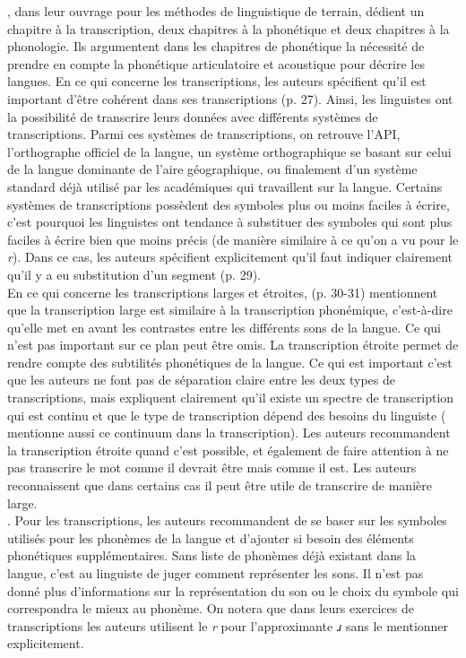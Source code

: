 \textcite{vauxIntroductionLinguisticField2003}, dans leur ouvrage pour les méthodes de linguistique de terrain, dédient un chapitre à la transcription, deux chapitres à la phonétique et deux chapitres à la phonologie. Ils argumentent dans les chapitres de phonétique la nécessité de prendre en compte la phonétique articulatoire et acoustique pour décrire les langues.
En ce qui concerne les transcriptions, les auteurs spécifient qu'il est important d'être cohérent dans ses transcriptions (p. 27). Ainsi, les linguistes ont la possibilité de transcrire leurs données avec différents systèmes de transcriptions. Parmi ces systèmes de transcriptions, on retrouve l'API, l'orthographe officiel de la langue, un système orthographique se basant sur celui de la langue dominante de l'aire géographique, ou finalement d'un système standard déjà utilisé par les académiques qui travaillent sur la langue.
Certains systèmes de transcriptions possèdent des symboles plus ou moins faciles à écrire, c'est pourquoi les linguistes ont tendance à substituer des symboles qui sont plus faciles à écrire bien que moins précis (de manière similaire à ce qu'on a vu pour le \textit{r}). Dans ce cas, les auteurs spécifient explicitement qu'il faut indiquer clairement qu'il y a eu substitution d'un segment (p. 29).\\

En ce qui concerne les transcriptions larges et étroites, \citeauthor{vauxIntroductionLinguisticField2003} (p. 30-31) mentionnent que la transcription large est similaire à la transcription phonémique, c'est-à-dire qu'elle met en avant les contrastes entre les différents sons de la langue. Ce qui n'est pas important sur ce plan peut être omis. La transcription étroite permet de rendre compte des subtilités phonétiques de la langue. Ce qui est important c'est que les auteurs ne font pas de séparation claire entre les deux types de transcriptions, mais expliquent clairement qu'il existe un spectre de transcription qui est continu et que le type de transcription dépend des besoins du linguiste (\textcite[73]{bowernLinguisticFieldwork2015} mentionne aussi ce continuum dans la transcription).
Les auteurs recommandent la transcription étroite quand c'est possible, et également de faire attention à ne pas transcrire le mot comme il devrait être mais comme il est. Les auteurs reconnaissent que  dans certains cas il peut être utile de transcrire de manière large.\\

 \parencite[31]{vauxIntroductionLinguisticField2003}. Pour les transcriptions, les auteurs recommandent de se baser sur les symboles utilisés pour les phonèmes de la langue et d'ajouter si besoin des éléments phonétiques supplémentaires. Sans liste de phonèmes déjà existant dans la langue, c'est au linguiste de juger comment représenter les sons. Il n'est pas donné plus d'informations sur la représentation du son ou le choix du symbole qui correspondra le mieux au phonème. On notera que dans leurs exercices de transcriptions les auteurs utilisent le \textit{r} pour l'approximante \textit{ɹ} sans le mentionner explicitement.\\

